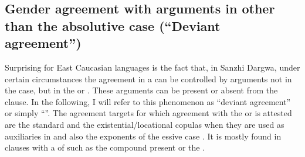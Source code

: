 
\subsection{Gender agreement with arguments in other than the absolutive case (``Deviant agreement'')}
\label{ssec:Gender agreement with arguments in other than the absolutive case}

Surprising for East Caucasian languages is the fact that, in Sanzhi Dargwa, under certain circumstances the agreement in a  can be controlled by arguments not in the  case, but in the  or . These arguments can be present or absent from the clause. In the following, I will refer to this phenomenon as ``deviant  agreement'' or simply ``''. The agreement targets for which agreement with the  or  is attested are the standard   and the existential/locational copulas  when they are used as auxiliaries in  and also the exponents of the essive case . It is mostly found in clauses with a  of  such as the compound present  or the  . 

